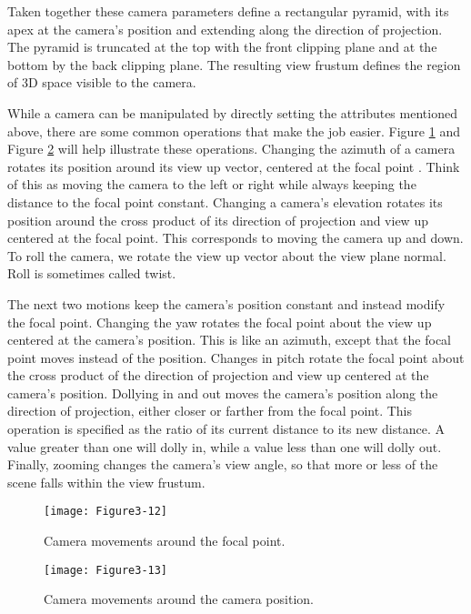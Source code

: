 Taken together these camera parameters define a rectangular pyramid, with its apex at the camera’s position and extending along the direction of projection. The pyramid is truncated at the top with the front clipping plane and at the bottom by the back clipping plane. The resulting view frustum defines the region of 3D space visible to the camera.

While a camera can be manipulated by directly setting the attributes mentioned above, there are some common operations that make the job easier. Figure \ref{fig:Figure3-12} and Figure \ref{fig:Figure3-13} will help illustrate these operations. Changing the azimuth of a camera rotates its position around its view up vector, centered at the focal point . Think of this as moving the camera to the left or right while always keeping the distance to the focal point constant. Changing a camera’s elevation rotates its position around the cross product of its direction of projection and view up centered at the focal point. This corresponds to moving the camera up and down. To roll the camera, we rotate the view up vector about the view plane normal. Roll is sometimes called twist.

The next two motions keep the camera’s position constant and instead modify the focal point. Changing the yaw rotates the focal point about the view up centered at the camera’s position. This is like an azimuth, except that the focal point moves instead of the position. Changes in pitch rotate the focal point about the cross product of the direction of projection and view up centered at the camera’s position. Dollying in and out moves the camera’s position along the direction of projection, either closer or farther from the focal point. This operation is specified as the ratio of its current distance to its new distance. A value greater than one will dolly in, while a value less than one will dolly out. Finally, zooming changes the camera’s view angle, so that more or less of the scene falls within the view frustum.

\begin{figure}[!htb]
  \centering
  \texttt{[image: Figure3-12]}\\
  \caption{Camera movements around the focal point.}\label{fig:Figure3-12}
\end{figure}

\begin{figure}[!htb]
  \centering
  \texttt{[image: Figure3-13]}\\
  \caption{Camera movements around the camera position.}\label{fig:Figure3-13}
\end{figure}

